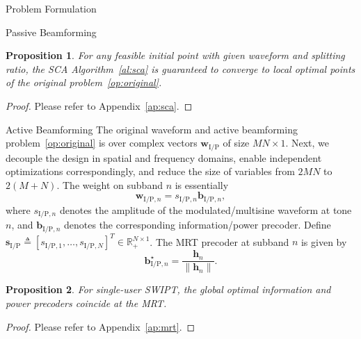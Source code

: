 \documentclass[journal]{IEEEtran}
\newtheorem{proposition}{Proposition}
\begin{document}
\begin{section}{Problem Formulation}
\begin{subsection}{Passive Beamforming}
			\begin{proposition}\label{pr:sca}
				For any feasible initial point with given waveform and splitting ratio, the SCA Algorithm~\ref{al:sca} is guaranteed to converge to local optimal points of the original problem~\eqref{op:original}.
			\end{proposition}

			\begin{proof}\label{pf:sca}
				Please refer to Appendix~\ref{ap:sca}.
			\end{proof}
		\end{subsection}

		\begin{subsection}{Active Beamforming}
			The original waveform and active beamforming problem~\eqref{op:original} is over complex vectors $\boldsymbol{w}_{\mathrm{I/P}}$ of size $MN \times 1$. Next, we decouple the design in spatial and frequency domains, enable independent optimizations correspondingly, and reduce the size of variables from $2MN$ to $2(M+N)$. The weight on subband $n$ is essentially
			\begin{equation}\label{eq:w}
				\boldsymbol{w}_{\mathrm{I/P}, n} = s_{\mathrm{I/P}, n} \boldsymbol{b}_{\mathrm{I/P}, n},
			\end{equation}
			where $s_{\mathrm{I/P},n}$ denotes the amplitude of the modulated/multisine waveform at tone $n$, and $\boldsymbol{b}_{\mathrm{I/P}, n}$ denotes the corresponding information/power precoder. Define $\boldsymbol{s}_{\mathrm{I/P}} \triangleq [s_{\mathrm{I/P},1},\dots,s_{\mathrm{I/P},N}]^T \in \mathbb{R}_+^{N \times 1}$. The MRT precoder at subband $n$ is given by
			\begin{equation}\label{eq:b_n}
				\boldsymbol{b}_{\mathrm{I/P}, n}^\star = \frac{\boldsymbol{h}_n}{\lVert{\boldsymbol{h}_n}\rVert}.
			\end{equation}

			\begin{proposition}\label{pr:mrt}
				For single-user SWIPT, the global optimal information and power precoders coincide at the MRT.
			\end{proposition}

			\begin{proof}\label{pf:mrt}
				Please refer to Appendix~\ref{ap:mrt}.
			\end{proof}
		\end{subsection}



\end{section}
\end{document}
